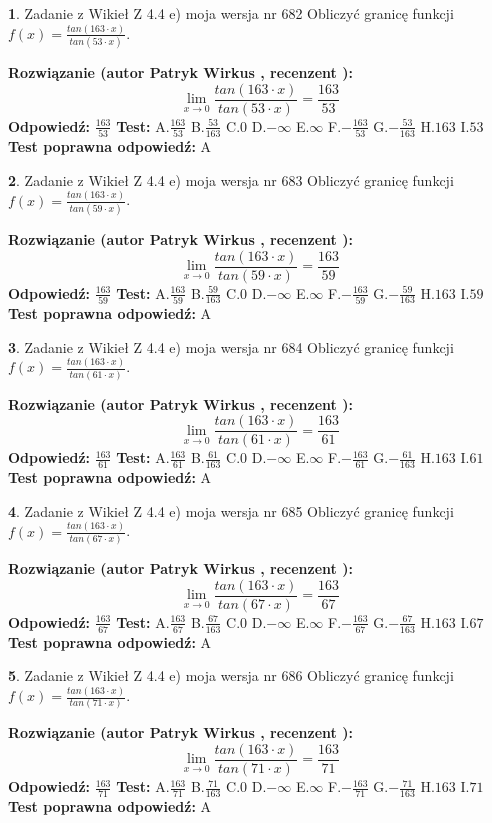 \documentclass[12pt, a4paper]{article}
\theoremstyle{definition} %
\newtheorem{zad}{}
\newcommand{\zadStart}[1]{\begin{zad}#1\newline}
\newcommand{\zadStop}{\end{zad}}
\newcommand{\rozwStart}[2]{\noindent \textbf{Rozwiązanie (autor #1 , recenzent #2): }\newline}
\newcommand{\rozwStop}{\newline}
\newcommand{\odpStart}{\noindent \textbf{Odpowiedź:}\newline}
\newcommand{\odpStop}{\newline}
\newcommand{\testStart}{\noindent \textbf{Test:}\newline}
\newcommand{\testStop}{\newline}
\newcommand{\kluczStart}{\noindent \textbf{Test poprawna odpowiedź:}\newline}
\newcommand{\kluczStop}{\newline}
\begin{document}
\zadStart{Zadanie z Wikieł Z 4.4 e) moja wersja nr 682}
Obliczyć granicę funkcji $f(x)=\frac{tan(163\cdot x)}{tan(53\cdot x)}$.
\zadStop
\rozwStart{Patryk Wirkus}{}
$$\lim\limits_{x\to 0}\frac{tan(163\cdot x)}{tan(53\cdot x)}=
\frac{163}{53}$$
\rozwStop
\odpStart
$\frac{163}{53}$
\odpStop
\testStart
A.$\frac{163}{53}$
B.$\frac{53}{163}$
C.$0$
D.$-\infty$
E.$\infty$
F.$-\frac{163}{53}$
G.$-\frac{53}{163}$
H.$163$
I.$53$
\testStop
\kluczStart
A
\kluczStop



\zadStart{Zadanie z Wikieł Z 4.4 e) moja wersja nr 683}
Obliczyć granicę funkcji $f(x)=\frac{tan(163\cdot x)}{tan(59\cdot x)}$.
\zadStop
\rozwStart{Patryk Wirkus}{}
$$\lim\limits_{x\to 0}\frac{tan(163\cdot x)}{tan(59\cdot x)}=
\frac{163}{59}$$
\rozwStop
\odpStart
$\frac{163}{59}$
\odpStop
\testStart
A.$\frac{163}{59}$
B.$\frac{59}{163}$
C.$0$
D.$-\infty$
E.$\infty$
F.$-\frac{163}{59}$
G.$-\frac{59}{163}$
H.$163$
I.$59$
\testStop
\kluczStart
A
\kluczStop



\zadStart{Zadanie z Wikieł Z 4.4 e) moja wersja nr 684}
Obliczyć granicę funkcji $f(x)=\frac{tan(163\cdot x)}{tan(61\cdot x)}$.
\zadStop
\rozwStart{Patryk Wirkus}{}
$$\lim\limits_{x\to 0}\frac{tan(163\cdot x)}{tan(61\cdot x)}=
\frac{163}{61}$$
\rozwStop
\odpStart
$\frac{163}{61}$
\odpStop
\testStart
A.$\frac{163}{61}$
B.$\frac{61}{163}$
C.$0$
D.$-\infty$
E.$\infty$
F.$-\frac{163}{61}$
G.$-\frac{61}{163}$
H.$163$
I.$61$
\testStop
\kluczStart
A
\kluczStop



\zadStart{Zadanie z Wikieł Z 4.4 e) moja wersja nr 685}
Obliczyć granicę funkcji $f(x)=\frac{tan(163\cdot x)}{tan(67\cdot x)}$.
\zadStop
\rozwStart{Patryk Wirkus}{}
$$\lim\limits_{x\to 0}\frac{tan(163\cdot x)}{tan(67\cdot x)}=
\frac{163}{67}$$
\rozwStop
\odpStart
$\frac{163}{67}$
\odpStop
\testStart
A.$\frac{163}{67}$
B.$\frac{67}{163}$
C.$0$
D.$-\infty$
E.$\infty$
F.$-\frac{163}{67}$
G.$-\frac{67}{163}$
H.$163$
I.$67$
\testStop
\kluczStart
A
\kluczStop



\zadStart{Zadanie z Wikieł Z 4.4 e) moja wersja nr 686}
Obliczyć granicę funkcji $f(x)=\frac{tan(163\cdot x)}{tan(71\cdot x)}$.
\zadStop
\rozwStart{Patryk Wirkus}{}
$$\lim\limits_{x\to 0}\frac{tan(163\cdot x)}{tan(71\cdot x)}=
\frac{163}{71}$$
\rozwStop
\odpStart
$\frac{163}{71}$
\odpStop
\testStart
A.$\frac{163}{71}$
B.$\frac{71}{163}$
C.$0$
D.$-\infty$
E.$\infty$
F.$-\frac{163}{71}$
G.$-\frac{71}{163}$
H.$163$
I.$71$
\testStop
\kluczStart
A
\kluczStop
\end{document}
